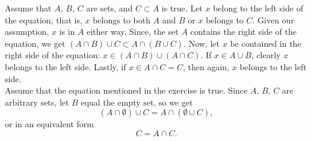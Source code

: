 Assume that $A, \, B, \, C$ are sets, and $C \subset A$ is true. Let $x$ belong to the left side of the equation; that is, $x$ belongs to both $A$ and $B$ or $x$ belongs to $C$. Given our assumption, $x$ is in $A$ either way. Since, the set $A$ contains the right side of the equation, we get $(A \cap B) \cup C \subset A \cap (B \cup C)$. Now, let $x$ be contained in the right side of the equation: $x \in (A \cap B) \cup (A \cap C)$. If $x \in A \cup B$, clearly $x$ belongs to the left side. Lastly, if $x \in A \cap C = C$, then again, $x$ belongs to the left side.\\
Assume that the equation mentioned in the exercise is true. Since $A, \, B, \, C$ are arbitrary sets, let $B$ equal the empty set, so we get
\[
	(A \cap \emptyset) \cup C = A \cap (\emptyset \cup C),
\]
or in an equivalent form
\[
	C = A \cap C.
\]
